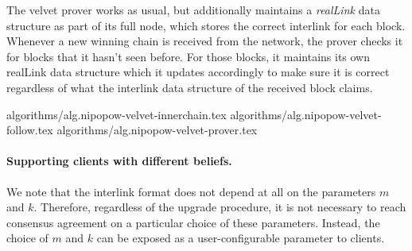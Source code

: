 The velvet prover works as usual, but additionally maintains a
\textit{realLink} data structure as part of its full node, which stores the
correct interlink for each block.  Whenever a new winning chain is received
from the network, the prover checks it for blocks that it hasn't seen before.
For those blocks, it maintains its own realLink data structure which it updates
accordingly to make sure it is correct regardless of what the interlink data
structure of the received block claims.

{algorithms/alg.nipopow-velvet-innerchain.tex}
{algorithms/alg.nipopow-velvet-follow.tex}
{algorithms/alg.nipopow-velvet-prover.tex}

\paragraph{Supporting clients with different beliefs.}
We note that the interlink format does not depend at all on the parameters $m$ and $k$.
Therefore, regardless of the upgrade procedure, it is not necessary to reach consensus agreement on a particular choice of these parameters. Instead, the choice of $m$ and $k$ can be exposed as a user-configurable parameter to clients.


